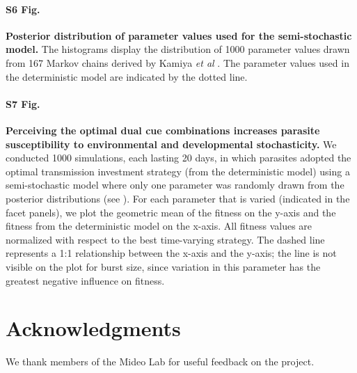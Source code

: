 \documentclass[10pt,letterpaper]{article}
\begin{document}
\paragraph*{S6 Fig.}
\label{S6_Fig}
{\bf Posterior distribution of parameter values used for the semi-stochastic model.} The histograms display the distribution of 1000 parameter values drawn from 167 Markov chains derived by Kamiya \emph{et al} \cite{kamiya_uncovering_2020}. The parameter values used in the deterministic model are indicated by the dotted line.\newline

\paragraph*{S7 Fig.}
\label{S7_Fig}
{\bf Perceiving the optimal dual cue combinations increases parasite susceptibility to environmental and developmental stochasticity.} We conducted 1000 simulations, each lasting 20 days, in which parasites adopted the optimal transmission investment strategy (from the deterministic model) using a semi-stochastic model where only one parameter was randomly drawn from the posterior distributions (see ). For each parameter that is varied (indicated in the facet panels), we plot the geometric mean of the fitness on the y-axis and the fitness from the deterministic model on the x-axis. All fitness values are normalized with respect to the best time-varying strategy. The dashed line represents a 1:1 relationship between the x-axis and the y-axis; the line is not visible on the plot for burst size, since variation in this parameter has the greatest negative influence on fitness.

\section*{Acknowledgments}
We thank members of the Mideo Lab for useful feedback on the project.

\nolinenumbers
\end{document}
